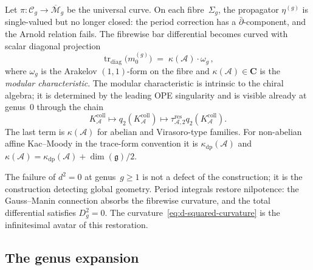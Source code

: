\documentclass[11pt,reqno]{amsart}
\theoremstyle{definition}
\theoremstyle{remark}
\newcommand{\cA}{\mathcal{A}}
\newcommand{\cM}{\mathcal{M}}
\newcommand{\fg}{\mathfrak{g}}
\renewcommand{\Bbbk}{\mathbf{C}}
\numberwithin{equation}{section}
\begin{document}
Let $\pi \colon \mathcal{C}_g \to \overline{\cM}_g$ be the
universal curve. On each fibre~$\Sigma_g$, the propagator
$\eta^{(g)}$ is single-valued but no longer closed: the
period correction has a $\bar\partial$-component, and the
Arnold relation fails. The fibrewise bar differential becomes curved
with scalar diagonal projection
\begin{equation}\label{eq:d-squared-curvature}
\operatorname{tr}_{\mathrm{diag}}\!\bigl(m_0^{(g)}\bigr)
\;=\;
\kappa(\cA) \cdot \omega_g\,,
\end{equation}
where $\omega_g$ is the Arakelov $(1,1)$-form on the fibre
and $\kappa(\cA) \in \Bbbk$ is the \emph{modular
characteristic}. The modular characteristic is intrinsic to
the chiral algebra; it is determined by the leading OPE
singularity and is visible already at genus~$0$ through the chain
\[
K_\cA^{\mathrm{coll}}\longmapsto
q_2(K_\cA^{\mathrm{coll}})\longmapsto
\tau_{\cA,2}^{\mathrm{res}}q_2(K_\cA^{\mathrm{coll}}).
\]
The last term is $\kappa(\cA)$ for abelian and Virasoro-type
families. For non-abelian affine Kac--Moody in the trace-form
convention it is $\kappa_{\mathrm{dp}}(\cA)$ and
$\kappa(\cA) = \kappa_{\mathrm{dp}}(\cA) + \dim(\fg)/2$.

The failure of $d^2 = 0$ at genus~$g \ge 1$ is not a defect
of the construction; it is the construction detecting global
geometry. Period integrals restore nilpotence: the
Gauss--Manin connection absorbs the fibrewise curvature, and
the total differential satisfies $D_g^2 = 0$. The
curvature~\eqref{eq:d-squared-curvature} is the
infinitesimal avatar of this restoration.

\subsection{The genus expansion}
\label{ssec:genus-expansion}
\end{document}
